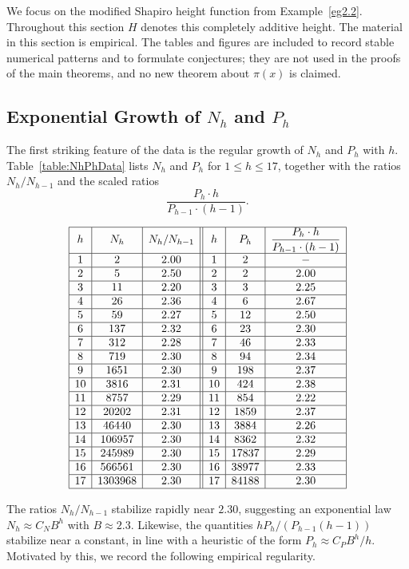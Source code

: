 \documentclass[11pt]{article}
\theoremstyle{definition}
\begin{document}
We focus on the modified Shapiro height function from Example~\ref{eg2.2}.
Throughout this section $H$ denotes this completely additive height.  The
material in this section is empirical.  The tables and figures are included to
record stable numerical patterns and to formulate conjectures; they are not used
in the proofs of the main theorems, and no new theorem about $\pi(x)$ is claimed.

\subsection{Exponential Growth of $N_h$ and $P_h$}

The first striking feature of the data is the regular growth of $N_h$ and
$P_h$ with $h$.  Table~\ref{table:NhPhData} lists $N_h$ and $P_h$ for
$1\le h\le17$, together with the ratios $N_h/N_{h-1}$ and the scaled ratios
\[
  \frac{P_h\cdot h}{P_{h-1}\cdot(h-1)}.
\]

\begin{table}[ht]
\centering
\[
\begin{array}{| c | c| c || c| c| c |}
\hline
h & N_h & N_h/N_{h-1} & h & P_h & \dfrac{P_h\cdot h}{P_{h-1}\cdot(h-1)} \\
\hline
1  & 2       & 2.00 & 1  & 2       & -    \cr \hline
2  & 5       & 2.50 & 2  & 2       & 2.00 \cr \hline
3  & 11      & 2.20 & 3  & 3       & 2.25 \cr \hline
4  & 26      & 2.36 & 4  & 6       & 2.67 \cr \hline
5  & 59      & 2.27 & 5  & 12      & 2.50 \cr \hline
6  & 137     & 2.32 & 6  & 23      & 2.30 \cr \hline
7  & 312     & 2.28 & 7  & 46      & 2.33 \cr \hline
8  & 719     & 2.30 & 8  & 94      & 2.34 \cr \hline
9  & 1651    & 2.30 & 9  & 198     & 2.37 \cr \hline
10 & 3816    & 2.31 & 10 & 424     & 2.38 \cr \hline
11 & 8757    & 2.29 & 11 & 854     & 2.22 \cr \hline
12 & 20202   & 2.31 & 12 & 1859    & 2.37 \cr \hline
13 & 46440   & 2.30 & 13 & 3884    & 2.26 \cr \hline
14 & 106957  & 2.30 & 14 & 8362    & 2.32 \cr \hline
15 & 245989  & 2.30 & 15 & 17837   & 2.29 \cr \hline
16 & 566561  & 2.30 & 16 & 38977   & 2.33 \cr \hline
17 & 1303968 & 2.30 & 17 & 84188   & 2.30 \cr \hline
\end{array}
\]
\caption{$N_h$ and $P_h$ for $h=1,\dots,17$ for the modified Shapiro height.}
\label{table:NhPhData}
\end{table}

The ratios $N_h/N_{h-1}$ stabilize rapidly near $2.30$, suggesting an
exponential law $N_h\approx C_N B^h$ with $B\approx 2.3$.  Likewise,
the quantities $hP_h/(P_{h-1}(h-1))$ stabilize near a constant, in line with
a heuristic of the form $P_h\approx C_P B^h/h$.
Motivated by this, we record the following empirical regularity.
\end{document}
